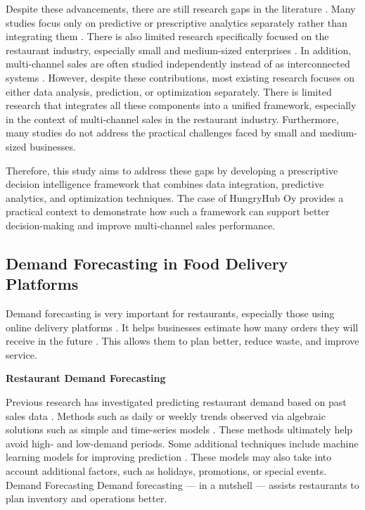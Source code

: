 Despite these advancements, there are still research gaps in the literature \cite{zhang2025timeraf}. Many studies focus only on predictive or prescriptive analytics separately rather than integrating them \cite{frazzetto2019prescriptive}. There is also limited research specifically focused on the restaurant industry, especially small and medium-sized enterprises \cite{li2024criticality}. In addition, multi-channel sales are often studied independently instead of as interconnected systems \cite{furst2022multi}. However, despite these contributions, most existing research focuses on either data analysis, prediction, or optimization separately. There is limited research that integrates all these components into a unified framework, especially in the context of multi-channel sales in the restaurant industry. Furthermore, many studies do not address the practical challenges faced by small and medium-sized businesses.

Therefore, this study aims to address these gaps by developing a prescriptive decision intelligence framework that combines data integration, predictive analytics, and optimization techniques. The case of HungryHub Oy provides a practical context to demonstrate how such a framework can support better decision-making and improve multi-channel sales performance.


\subsection{Demand Forecasting in Food Delivery Platforms}

Demand forecasting is very important for restaurants, especially those using online delivery platforms \citep{chae2024value}. It helps businesses estimate how many orders they will receive in the future \citep{li2025demand}. This allows them to plan better, reduce waste, and improve service.

\textbf{Restaurant Demand Forecasting}

Previous research has investigated predicting restaurant demand based on past sales data \citep{shinoda2021prediction, fernandes2021data}. Methods such as daily or weekly trends observed via algebraic solutions such as simple and time-series models \citep{wang2024deep}. These methods ultimately help avoid high- and low-demand periods. Some additional techniques include machine learning models for improving prediction \citep{rasheed2023improving}. These models may also take into account additional factors, such as holidays, promotions, or special events. Demand Forecasting Demand forecasting — in a nutshell — assists restaurants to plan inventory and operations better.

